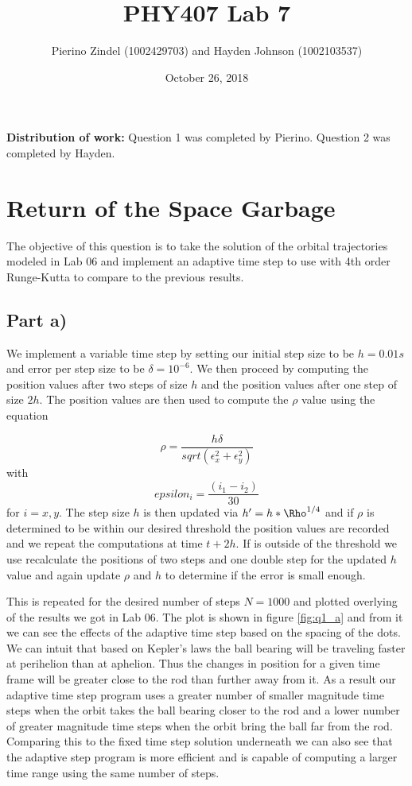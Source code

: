 \documentclass{article}
\title{PHY407 Lab 7}
\author{Pierino Zindel (1002429703) and Hayden Johnson (1002103537)}
\date{October 26, 2018}
\begin{document}
\maketitle

\noindent \textbf{Distribution of work:} Question 1 was completed by Pierino. Question 2 was completed by Hayden.

\section{Return of the Space Garbage}
The objective of this question is to take the solution of the orbital trajectories modeled in Lab 06 and implement an adaptive time step to use with 4th order Runge-Kutta to compare to the previous results.

\subsection{Part a)}
We implement a variable time step by setting our initial step size to be $h=0.01s$ and error per step size to be $\delta=10^{-6}$. We then proceed by computing the position values after two steps of size $h$ and the position values after one step of size $2h$. The position values are then used to compute the $\rho$ value using the equation

\begin{equation}
	\rho = \frac{h\delta}{sqrt(\epsilon_x^2 + \epsilon_y^2)}
\end{equation}
with 
\begin{equation}
	epsilon_i = \frac{(i_1-i_2)}{30}
\end{equation}
for $i=x,y$.
The step size $h$ is then updated via $h' = h*\Rho^{1/4}$ and if $\rho$ is determined to be within our desired threshold the position values are recorded and we repeat the computations at time $t+2h$. If \rho is outside of the threshold we use recalculate the positions of two steps and one double step for the updated $h$ value and again update $\rho$ and $h$ to determine if the error is small enough.

This is repeated for the desired number of steps $N=1000$ and plotted overlying of the results we got in Lab 06. The plot is shown in figure \ref{fig:q1_a} and from it we can see the effects of the adaptive time step based on the spacing of the dots. We can intuit that based on Kepler's laws the ball bearing will be traveling faster at perihelion than at aphelion. Thus the changes in position for a given time frame will be greater close to the rod than further away from it. As a result our adaptive time step program uses a greater number of smaller magnitude time steps when the orbit takes the ball bearing closer to the rod and a lower number of greater magnitude time steps when the orbit bring the ball far from the rod. Comparing this to the fixed time step solution underneath we can also see that the adaptive step program is more efficient and is capable of computing a larger time range using the same number of steps. 
\end{document}
